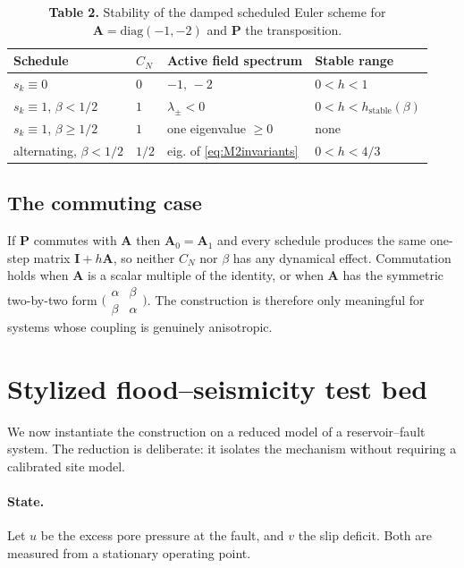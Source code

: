 \documentclass[12pt, a4paper]{article}
\theoremstyle{plain}
\theoremstyle{definition}
\theoremstyle{remark}
\newcommand{\bI}{\mathbf{I}}
\newcommand{\bP}{\mathbf{P}}
\newcommand{\bA}{\mathbf{A}}
\begin{document}
\begin{table}[H]
  \centering
  \caption{\textbf{Table 2.} Stability of the damped scheduled Euler scheme
  for $\bA = \mathrm{diag}(-1,-2)$ and $\bP$ the transposition.}
  \label{tab:stability}
  \begin{tabular}{llll}
    \toprule
    \textbf{Schedule} & $C_N$ & \textbf{Active field spectrum} & \textbf{Stable range} \\
    \midrule
    $s_k \equiv 0$                 & $0$   & $-1,\,-2$ & $0<h<1$ \\
    $s_k \equiv 1$, $\beta < 1/2$  & $1$   & $\lambda_\pm < 0$ & $0 < h < h_{\mathrm{stable}}(\beta)$ \\
    $s_k \equiv 1$, $\beta \ge 1/2$ & $1$  & one eigenvalue $\ge 0$ & none \\
    alternating, $\beta < 1/2$     & $1/2$ & eig. of \eqref{eq:M2invariants} & $0 < h < 4/3$ \\
    \bottomrule
  \end{tabular}
\end{table}

\subsection{The commuting case}

If $\bP$ commutes with $\bA$ then $\bA_0=\bA_1$ and every schedule produces
the same one-step matrix $\bI+h\bA$, so neither $C_N$ nor $\beta$ has any
dynamical effect. Commutation holds when $\bA$ is a scalar multiple of the
identity, or when $\bA$ has the symmetric two-by-two form
$\big(\begin{smallmatrix}\alpha&\beta\\\beta&\alpha\end{smallmatrix}\big)$.
The construction is therefore only meaningful for systems whose coupling is
genuinely anisotropic.

\section{Stylized flood--seismicity test bed}
\label{sec:testbed}

We now instantiate the construction on a reduced model of a reservoir--fault
system. The reduction is deliberate: it isolates the mechanism without
requiring a calibrated site model.

\paragraph{State.} Let $u$ be the excess pore pressure at the fault, and $v$
the slip deficit. Both are measured from a stationary operating point.
\end{document}
